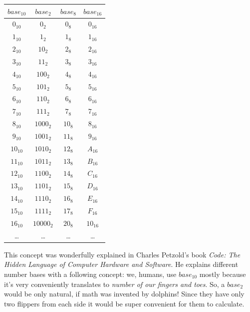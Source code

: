 \documentclass{article}
\begin{document}
            \begin{center}
                \begin{longtable}{|c|c|c|c|}
                    \hline
                    $base_{10}$ & $base_2$ & $base_8$ & $base_{16}$ \\\hline
                    $0_{10}$ & $0_2$ & $0_8$ & $0_{16}$ \\\hline
                    $1_{10}$ & $1_2$ & $1_8$ & $1_{16}$ \\\hline
                    $2_{10}$ & $10_2$ & $2_8$ & $2_{16}$ \\\hline
                    $3_{10}$ & $11_2$ & $3_8$ & $3_{16}$ \\\hline
                    $4_{10}$ & $100_2$ & $4_8$ & $4_{16}$ \\\hline
                    $5_{10}$ & $101_2$ & $5_8$ & $5_{16}$ \\\hline
                    $6_{10}$ & $110_2$ & $6_8$ & $6_{16}$ \\\hline
                    $7_{10}$ & $111_2$ & $7_8$ & $7_{16}$ \\\hline
                    $8_{10}$ & $1000_2$ & $10_8$ & $8_{16}$ \\\hline
                    $9_{10}$ & $1001_2$ & $11_8$ & $9_{16}$ \\\hline
                    $10_{10}$ & $1010_2$ & $12_8$ & $A_{16}$ \\\hline
                    $11_{10}$ & $1011_2$ & $13_8$ & $B_{16}$ \\\hline 
                    $12_{10}$ & $1100_2$ & $14_8$ & $C_{16}$ \\\hline
                    $13_{10}$ & $1101_2$ & $15_8$ & $D_{16}$ \\\hline
                    $14_{10}$ & $1110_2$ & $16_8$ & $E_{16}$ \\\hline
                    $15_{10}$ & $1111_2$ & $17_8$ & $F_{16}$ \\\hline
                    $16_{10}$ & $10000_2$ & $20_8$ & $10_{16}$ \\\hline 
                    \ldots & \ldots & \ldots & \ldots \\\hline
                \end{longtable}
            \end{center}


            This concept was wonderfully explained in Charles Petzold's book \emph{Code: The Hidden Language of Computer Hardware and Software}. He explains different
            number bases with a following concept: we, humans, use $base_{10}$ mostly because it's very conveniently translates to \emph{number of our fingers and toes}.
            So, a $base_2$ would be only natural, if math was invented by dolphins! Since they have only two flippers from each side it would be super convenient for
            them to calculate. \par
            
\end{document}
